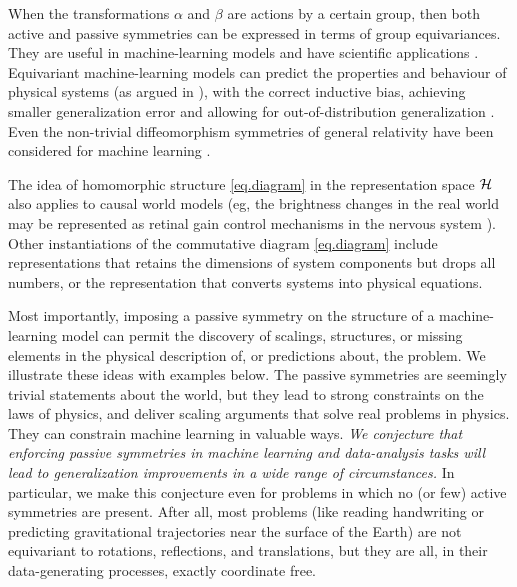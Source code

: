 \documentclass{article}
\begin{document}
When the transformations $\alpha$ and $\beta$ are actions by a certain group, then both active and passive symmetries can be expressed in terms of group equivariances.
They are useful in machine-learning models \cite{cohen2016group, kondor2018convolution, thomas2018tensor, geiger2022e3nn, finzi2020generalizing, finzi2021practical} and have scientific applications \cite{batzner20223, musaelian2022learning, stark2022equibind, yu-physics, wang2022approximately}.
Equivariant machine-learning models can predict the properties and behaviour of physical systems (as argued in \cite{cheng2019covariance}), with the correct inductive bias, achieving smaller generalization error \cite{bietti2021sample, elesedy2021provably, elesedy2021kernel, mei2021learning} and allowing for out-of-distribution generalization \cite{villar2022dimensionless}. 
Even the non-trivial diffeomorphism symmetries of general relativity have been considered for machine learning \cite{weiler}.

The idea of homomorphic structure \eqref{eq.diagram} in the representation space $\cal H$ also applies to causal world models (eg, the brightness changes in the real world may be represented as retinal gain control mechanisms in the nervous system \cite{1911.10500}).
Other instantiations of the commutative diagram \eqref{eq.diagram} include representations that retains the dimensions of system components but drops all numbers, or the representation that converts systems into physical equations.

Most importantly, imposing a passive symmetry on the structure of a machine-learning model can permit the discovery of scalings, structures, or missing elements in the physical description of, or predictions about, the problem.
We illustrate these ideas with examples below.
The passive symmetries are seemingly trivial statements about the world, but they lead to strong constraints on the laws of physics, and deliver scaling arguments that solve real problems in physics.
They can constrain machine learning in valuable ways.
\emph{We conjecture that enforcing passive symmetries in machine learning and data-analysis tasks will lead to generalization improvements in a wide range of circumstances.}
In particular, we make this conjecture even for problems in which no (or few) active symmetries are present.
After all, most problems (like reading handwriting or predicting gravitational trajectories near the surface of the Earth) are not equivariant to rotations, reflections, and translations, but they are all, in their data-generating processes, exactly coordinate free.
\end{document}

